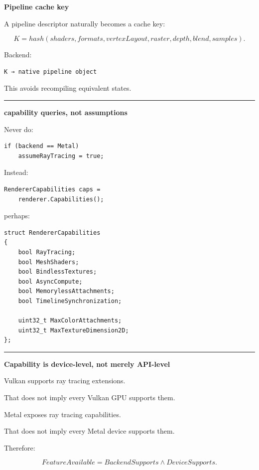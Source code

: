 \textbf{Pipeline cache key}

A pipeline descriptor naturally becomes a cache key:

\[
K=
hash(
shaders,
formats,
vertexLayout,
raster,
depth,
blend,
samples
).
\]

Backend:

\begin{verbatim}
K → native pipeline object
\end{verbatim}

This avoids recompiling equivalent states.

\begin{center}\rule{0.5\linewidth}{0.5pt}\end{center}

\textbf{capability queries, not assumptions}

Never do:

\begin{verbatim}
if (backend == Metal)
    assumeRayTracing = true;
\end{verbatim}

Instead:

\begin{verbatim}
RendererCapabilities caps =
    renderer.Capabilities();
\end{verbatim}

perhaps:

\begin{verbatim}
struct RendererCapabilities
{
    bool RayTracing;
    bool MeshShaders;
    bool BindlessTextures;
    bool AsyncCompute;
    bool MemorylessAttachments;
    bool TimelineSynchronization;

    uint32_t MaxColorAttachments;
    uint32_t MaxTextureDimension2D;
};
\end{verbatim}

\begin{center}\rule{0.5\linewidth}{0.5pt}\end{center}

\textbf{Capability is device-level, not merely API-level}

Vulkan supports ray tracing extensions.

That does not imply every Vulkan GPU supports them.

Metal exposes ray tracing capabilities.

That does not imply every Metal device supports them.

Therefore:

\[
\boxed{
FeatureAvailable
=
BackendSupports
\land
DeviceSupports.
}
\]

